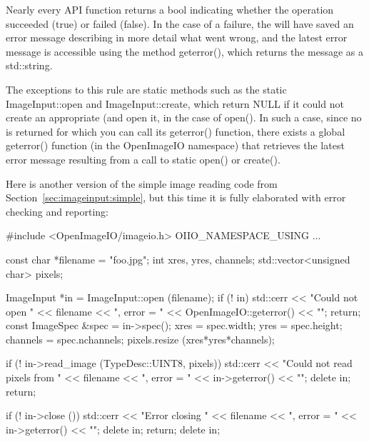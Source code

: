 Nearly every \ImageInput API function returns a {\cf bool} indicating
whether the operation succeeded ({\cf true}) or failed ({\cf false}).
In the case of a failure, the \ImageInput will have saved an error
message describing in more detail what went wrong, and the latest
error message is accessible using the \ImageInput method 
{\cf geterror()}, which returns the message as a {\cf std::string}.

The exceptions to this rule are static methods such as the static
{\cf ImageInput::open} and {\cf ImageInput::create}, which return
{\cf NULL} if it could not create an appropriate \ImageInput (and open
it, in the case of {\cf open()}.  In such a case,
since no \ImageInput is returned for which you can call its {\cf
  geterror()} function, there exists a global {\cf geterror()}
function (in the {\cf OpenImageIO} namespace) that retrieves the latest
error message resulting from a call to static {\cf open()} or {\cf create()}.

Here is another version of the simple image reading code from
Section~\ref{sec:imageinput:simple}, but this time it is fully
elaborated with error checking and reporting:

\begin{code}
        #include <OpenImageIO/imageio.h>
        OIIO_NAMESPACE_USING
        ...

        const char *filename = "foo.jpg";
        int xres, yres, channels;
        std::vector<unsigned char> pixels;

        ImageInput *in = ImageInput::open (filename);
        if (! in) {
            std::cerr << "Could not open " << filename 
                      << ", error = " << OpenImageIO::geterror() << "\n";
            return;
        }
        const ImageSpec &spec = in->spec();
        xres = spec.width;
        yres = spec.height;
        channels = spec.nchannels;
        pixels.resize (xres*yres*channels);

        if (! in->read_image (TypeDesc::UINT8, pixels)) {
            std::cerr << "Could not read pixels from " << filename 
                      << ", error = " << in->geterror() << "\n";
            delete in;
            return;
        }

        if (! in->close ()) {
            std::cerr << "Error closing " << filename 
                      << ", error = " << in->geterror() << "\n";
            delete in;
            return;
        }
        delete in;
\end{code}


